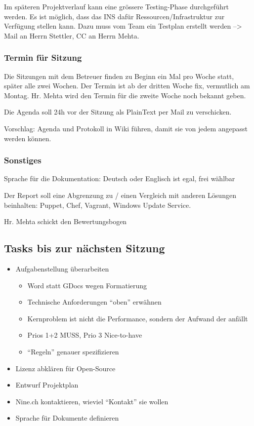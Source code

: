 \documentclass[class=scrbook,crop=false]{standalone}
\begin{document}
    Im späteren Projektverlauf kann eine grössere Testing-Phase durchgeführt werden. Es ist möglich, dass das INS dafür Ressourcen/Infrastruktur zur Verfügung stellen kann. Dazu muss vom Team ein Testplan erstellt werden --> Mail an Herrn Stettler, CC an Herrn Mehta.

    \subsubsection*{Termin für Sitzung}

    Die Sitzungen mit dem Betreuer finden zu Beginn ein Mal pro Woche statt, später alle zwei Wochen. Der Termin ist ab der dritten Woche fix, vermutlich am Montag. Hr. Mehta wird den Termin für die zweite Woche noch bekannt geben.

    Die Agenda soll 24h vor der Sitzung als PlainText per Mail zu verschicken.

    Vorschlag: Agenda und Protokoll in Wiki führen, damit sie von jedem angepasst werden können.


	\subsubsection*{Sonstiges}
	
	Sprache für die Dokumentation: Deutsch oder Englisch ist egal, frei wählbar
	
    Der Report soll eine Abgrenzung zu / einen Vergleich mit anderen Lösungen beinhalten: Puppet, Chef, Vagrant, Windows Update Service.
    
    Hr. Mehta schickt den Bewertungsbogen

    \subsection*{Tasks bis zur nächsten Sitzung}
    
    \begin{itemize}
        \item Aufgabenstellung überarbeiten
        \begin{itemize}
            \item Word statt GDocs wegen Formatierung
            \item Technische Anforderungen “oben” erwähnen
            \item Kernproblem ist nicht die Performance, sondern der Aufwand der anfällt
            \item Prios 1+2 MUSS, Prio 3 Nice-to-have
            \item “Regeln” genauer spezifizieren
        \end{itemize}
        \item Lizenz abklären für Open-Source
        \item Entwurf Projektplan
        \item Nine.ch kontaktieren, wieviel “Kontakt” sie wollen
        \item Sprache für Dokumente definieren
    \end{itemize}
\end{document}
